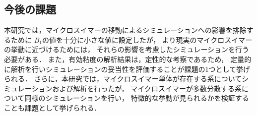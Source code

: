 \subsection{今後の課題}
本研究では，マイクロスイマーの移動によるシミュレーションへの影響を排除するために
$B_1$の値を十分に小さな値に設定したが，
より現実のマイクロスイマーの挙動に近づけるためには，
それらの影響を考慮したシミュレーションを行う必要がある．
また，有効粘度の解析結果は，定性的な考察であるため，
定量的に解析を行いシミュレーションの妥当性を評価することが課題の1つとして挙げられる．
さらに，本研究では，マイクロスイマー単体が存在する系についてシミュレーションおよび解析を行ったが，
マイクロスイマーが多数分散する系について同様のシミュレーションを行い，
特徴的な挙動が見られるかを検証することも課題として挙げられる．
